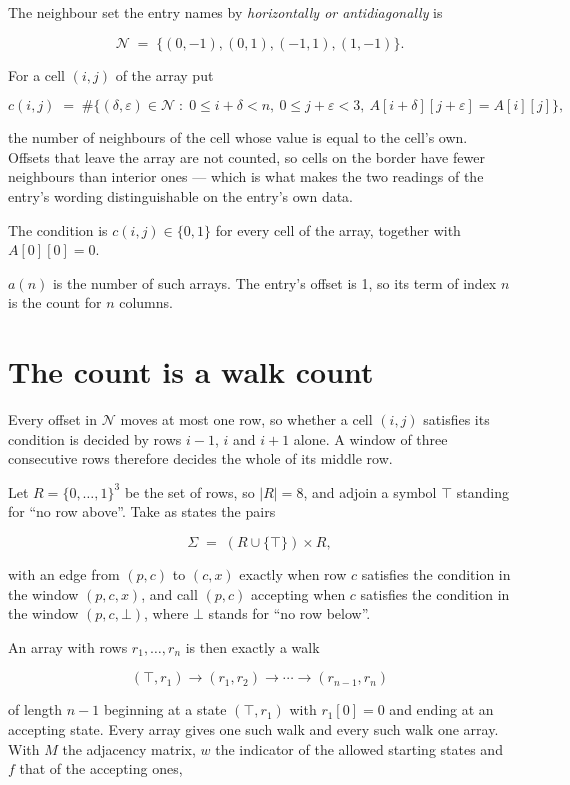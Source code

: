 \documentclass[11pt]{article}
\theoremstyle{definition}
\begin{document}
The neighbour set the entry names by {\itshape horizontally or antidiagonally} is

\[\mathcal{N} \;=\; \{(0,-1), (0,1), (-1,1), (1,-1)\}.\]

For a cell $(i,j)$ of the array put

\[c(i,j) \;=\; \#\bigl\{(\delta,\varepsilon)\in\mathcal{N} \;:\; 0\le i+\delta<n,\ 0\le j+\varepsilon<3,\ A[i+\delta][j+\varepsilon] = A[i][j]\bigr\},\]

the number of neighbours of the cell whose value is equal to the cell's own. Offsets that leave the array are not counted, so cells on the border have fewer neighbours than interior ones --- which is what makes the two readings of the entry's wording distinguishable on the entry's own data.

The condition is $c(i,j) \in \{0, 1\}$ for every cell of the array, together with $A[0][0]=0$.

$a(n)$ is the number of such arrays. The entry's offset is 1, so its term of index $n$ is the count for $n$ columns.

\section{The count is a walk count}

Every offset in $\mathcal{N}$ moves at most one row, so whether a cell $(i,j)$ satisfies its condition is decided by rows $i-1$, $i$ and $i+1$ alone. A window of three consecutive rows therefore decides the whole of its middle row.

Let $R = \{0,\dots,1\}^{3}$ be the set of rows, so $|R| = 8$, and adjoin a symbol $\top$ standing for ``no row above''. Take as states the pairs

\[\Sigma \;=\; (R \cup \{\top\}) \times R,\]

with an edge from $(p,c)$ to $(c,x)$ exactly when row $c$ satisfies the condition in the window $(p,c,x)$, and call $(p,c)$ accepting when $c$ satisfies the condition in the window $(p,c,\bot)$, where $\bot$ stands for ``no row below''.

An array with rows $r_1,\dots,r_n$ is then exactly a walk

\[(\top,r_1) \to (r_1,r_2) \to \cdots \to (r_{n-1},r_n)\]

of length $n-1$ beginning at a state $(\top,r_1)$ with $r_1[0]=0$ and ending at an accepting state. Every array gives one such walk and every such walk one array. With $M$ the adjacency matrix, $w$ the indicator of the allowed starting states and $f$ that of the accepting ones,
\end{document}
